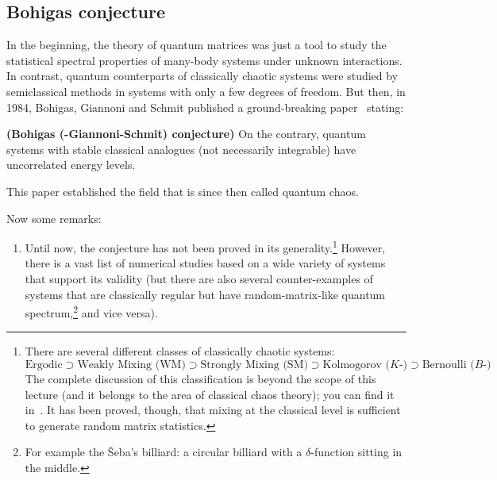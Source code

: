 \documentclass[a4paper,11pt,twoside]{article}
\begin{document}
        \subsection{Bohigas conjecture}
        In the beginning, the theory of quantum matrices was just a tool to study the statistical spectral properties of many-body systems under unknown interactions. 
        In contrast, quantum counterparts of classically chaotic systems were studied by semiclassical methods in systems with only a few degrees of freedom.
        But then, in 1984, Bohigas, Giannoni and Schmit published a ground-breaking paper~\cite{Boh84} stating:
        \begin{theorem}
            {\bf (Bohigas (-Giannoni-Schmit) conjecture)}
            On the contrary, quantum systems with stable classical analogues (not necessarily integrable) have uncorrelated energy levels.
        \end{theorem}
        This paper established the field that is since then called quantum chaos.

        Now some remarks: 
        \begin{enumerate}
            \item Until now, the conjecture has not been proved in its generality.\footnote{
                    There are several different classes of classically chaotic systems:
                    \begin{equation*}
                        \boxed{\text{Ergodic}}
                            \supset\boxed{\text{Weakly Mixing (WM)}}
                            \supset\boxed{\text{Strongly Mixing (SM)}}
                            \supset\boxed{\text{Kolmogorov ($K$-)}}
                            \supset\boxed{\text{Bernoulli ($B$-)}}
                    \end{equation*}
                    The complete discussion of this classification is beyond the scope of this lecture (and it belongs to the area of classical chaos theory); you can find it in~\cite{Sin77}.
                    It has been proved, though, that mixing at the classical level is sufficient to generate random matrix statistics.
                } 
                However, there is a vast list of numerical studies based on a wide variety of systems that support its validity (but there are also several counter-examples of systems that are classically regular but have random-matrix-like quantum spectrum,\footnote{For example the Šeba's billiard: a circular billiard with a $\delta$-function sitting in the middle.} and vice versa).
        \end{enumerate}
\end{document}
